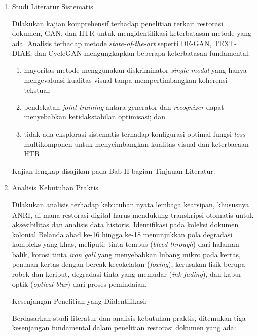 \documentclass[12pt,a4paper]{article}
\begin{document}

\begin{enumerate}[label=\arabic*., leftmargin=*, nosep]
    \item Studi Literatur Sistematis

          Dilakukan kajian komprehensif terhadap penelitian terkait restorasi dokumen, GAN, dan HTR untuk mengidentifikasi keterbatasan metode yang ada. Analisis terhadap metode \textit{state-of-the-art} seperti DE-GAN, TEXT-DIAE, dan CycleGAN mengungkapkan beberapa keterbatasan fundamental:
          \begin{enumerate}[label=(\arabic*), leftmargin=*, nosep]
              \item mayoritas metode menggunakan diskriminator \textit{single-modal} yang hanya mengevaluasi kualitas visual tanpa mempertimbangkan koherensi tekstual;
              \item pendekatan \textit{joint training} antara generator dan \textit{recognizer} dapat menyebabkan ketidakstabilan optimisasi; dan
              \item tidak ada eksplorasi sistematis terhadap konfigurasi optimal fungsi \textit{loss} multikomponen untuk menyeimbangkan kualitas visual dan keterbacaan HTR.
          \end{enumerate}
          Kajian lengkap disajikan pada Bab II bagian Tinjauan Literatur.

    \item Analisis Kebutuhan Praktis

          Dilakukan analisis terhadap kebutuhan nyata lembaga kearsipan, khususnya ANRI, di mana restorasi digital harus mendukung transkripsi otomatis untuk aksesibilitas dan analisis data historis. Identifikasi pada koleksi dokumen kolonial Belanda abad ke-16 hingga ke-18 menunjukkan pola degradasi kompleks yang khas, meliputi: tinta tembus (\textit{bleed-through}) dari halaman balik, korosi tinta \textit{iron gall} yang menyebabkan lubang mikro pada kertas, penuaan kertas dengan bercak kecokelatan (\textit{foxing}), kerusakan fisik berupa robek dan keriput, degradasi tinta yang memudar (\textit{ink fading}), dan kabur optik (\textit{optical blur}) dari proses pemindaian.

          Kesenjangan Penelitian yang Diidentifikasi:

          Berdasarkan studi literatur dan analisis kebutuhan praktis, ditemukan tiga kesenjangan fundamental dalam penelitian restorasi dokumen yang ada:


\end{enumerate}
\end{document}
